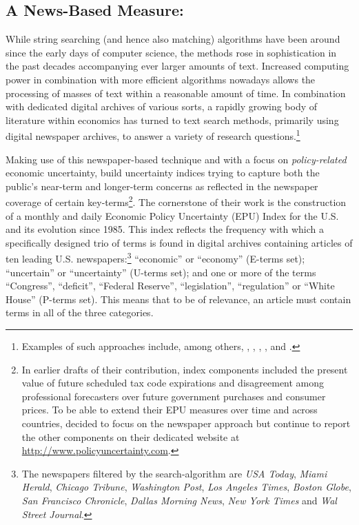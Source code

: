 \documentclass[a4paper,11pt,listof=nochaptergap,oneside,pointednumbers,bibtotoc,bigheadings,liststotoc]{scrbook}
\theoremstyle{mysatz}
\theoremstyle{mydefinition}
\theoremstyle{mybemerkung}
\begin{document}
\subsection{A News-Based Measure: \citet{bakeretal:15}}
\label{sec:epuindex}
While string searching (and hence also matching) algorithms have been around since the early days of computer science, the methods rose in sophistication in the past decades accompanying ever larger amounts of text. Increased computing power in combination with more efficient algorithms nowadays allows the processing of masses of text within a reasonable amount of time. In combination with dedicated digital archives of various sorts, a rapidly growing body of literature within economics has turned to text search methods, primarily using digital newspaper archives, to answer a variety of research questions.\footnote{Examples of such approaches include, among others, \citet{alexopoulosandcohen:09}, \citet{genthkowandshapiro:10}, \citet{hobergandphillips:10}, \citet{boudoukhetal:13}, and \citet{alexopoulosandcohen:15}.}

Making use of this newspaper-based technique and with a focus on \textit{policy-related} economic uncertainty, \citet{bakeretal:15} build uncertainty indices trying to capture both the public's near-term and longer-term concerns as reflected in the newspaper coverage of certain key-terms\footnote{In earlier drafts of their contribution, index components included the present value of future scheduled tax code expirations and disagreement among professional forecasters over future government purchases and consumer prices. To be able to extend their EPU measures over time and across countries, \citet{bakeretal:15} decided to focus on the newspaper approach but continue to report the other components on their dedicated website at \url{http://www.policyuncertainty.com}.}. The cornerstone of their work is the construction of a monthly and daily Economic Policy Uncertainty (EPU) Index for the U.S. and its evolution since 1985. This index reflects the frequency with which a specifically designed trio of terms is found in digital archives containing articles of ten leading U.S. newspapers:\footnote{The newspapers filtered by the search-algorithm are \textit{USA Today}, \textit{Miami Herald}, \textit{Chicago Tribune}, \textit{Washington Post}, \textit{Los Angeles Times}, \textit{Boston Globe}, \textit{San Francisco Chronicle}, \textit{Dallas Morning News}, \textit{New York Times} and \textit{Wal Street Journal}.} ``economic'' or ``economy'' (E-terms set); ``uncertain'' or ``uncertainty'' (U-terms set); and one or more of the terms ``Congress'', ``deficit'', ``Federal Reserve'', ``legislation'', ``regulation'' or ``White House'' (P-terms set). This means that to be of relevance, an article must contain terms in all of the three categories.
\end{document}
